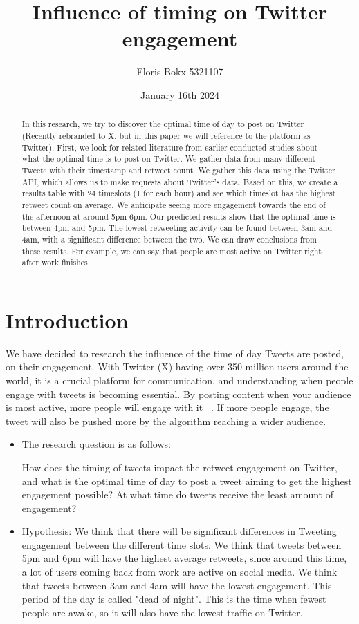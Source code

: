 \documentclass[11pt]{article}
\title{Influence of timing on Twitter engagement}
\author{Floris Bokx 5321107\\}
\date{January 16th 2024}
\begin{document}
\maketitle

\begin{abstract}
In this research, we try to discover the optimal time of day to post on Twitter (Recently rebranded to X, but in this paper we will reference to the platform as Twitter). First, we look for related literature from earlier conducted studies about what the optimal time is to post on Twitter. We gather data from many different Tweets with their timestamp and retweet count. We gather this data using the Twitter API, which allows us to make requests about Twitter's data. Based on this, we create a results table with 24 timeslots (1 for each hour) and see which timeslot has the highest retweet count on average. We anticipate seeing more engagement towards the end of the afternoon at around 5pm-6pm. Our predicted results show that the optimal time is between 4pm and 5pm. The lowest retweeting activity can be found between 3am and 4am, with a significant difference between the two. We can draw conclusions from these results. For example, we can say that people are most active on Twitter right after work finishes. 

\end{abstract}


\section{Introduction}
We have decided to research the influence of the time of day Tweets are posted, on their engagement. With Twitter (X) having over 350 million users around the world, it is a crucial platform for communication, and understanding when people engage with tweets is becoming essential. By posting content when your audience is most active, more people will engage with it ~\citep{AIContentfy:2023}. If more people engage, the tweet will also be pushed more by the algorithm reaching a wider audience.

\begin{itemize}
\item The research question is as follows: 

How does the timing of tweets impact the retweet engagement on Twitter, and what is the optimal time of day to post a tweet aiming to get the highest engagement possible? At what time do tweets receive the least amount of engagement?

\item Hypothesis: We think that there will be significant differences in Tweeting engagement between the different time slots. We think that tweets between 5pm and 6pm will have the highest average retweets, since around this time, a lot of users coming back from work are active on social media. We think that tweets between 3am and 4am will have the lowest engagement. This period of the day is called "dead of night". This is the time when fewest people are awake, so it will also have the lowest traffic on Twitter.


\end{itemize}
\end{document}
